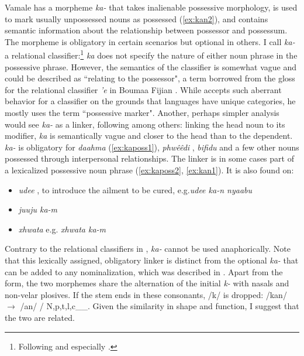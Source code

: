  Vamale has a morpheme \textit{ka-} that takes inalienable possessive morphology, is used to mark usually unpossessed nouns as possessed (\ref{ex:kan2}), and contains semantic information about the relationship between possessor and possessum. The morpheme is obligatory in certain scenarios but optional in others. I call \textit{ka-} a relational classifier:\footnote{Following \textcite[136]{aikhenvald_classifiers_2000} and especially \textcite[399]{lichtenberk_oceanic_2009}.} \textit{ka} does not specify the nature of either noun phrase in the possessive phrase.  However, the semantics of the classifier is somewhat vague and could be described as ``relating to the possessor", a term borrowed from the gloss for the relational classifier \textit{'e} in Boumaa Fijian \parencite[135]{dixon_grammar_1988}. While \textcite{lichtenberk_oceanic_2009} accepts such aberrant behavior for a classifier on the grounds that languages have unique categories, he mostly uses the term ``possessive marker". 
 Another, perhaps simpler analysis would see \textit{ka-} as a linker, following \textcite{bril_ownership_2012} among others: linking the head noun to its modifier, \textit{ka} is semantically vague and closer to the head than to the dependent.
 \textit{ka-} is obligatory for \textit{daahma}  (\ref{ex:kaposs1}), \textit{phwêêdi} , \textit{bifidu}  and a few other nouns possessed through interpersonal relationships. The linker is in some cases part of a lexicalized possessive noun phrase (\ref{ex:kaposs2}, \ref{ex:kan1}). It is also found on: 
 
 \begin{itemize}
 \sloppy
 \item \textit{udee} , to introduce the ailment to be cured, e.g.\textit{udee ka-n nyaabu} 
 \item \textit{juuju ka-m} 
 \item \textit{xhwata}  e.g. \textit{xhwata ka-m} 
 \end{itemize}
 
 Contrary to the relational classifiers in , \textit{ka-} cannot be used anaphorically. %
 Note that this lexically assigned, obligatory linker is distinct from the optional \textit{ka-} that can be added to any nominalization, which was described in . Apart from the form, the two morphemes share the alternation of the initial \textit{k-} with nasals and non-velar plosives. If the stem ends in these consonants, /k/ is dropped: /kan/ $\rightarrow$  /an/ / N,p,t,l,c\_\_. Given the similarity in shape and function, I suggest that the two are related.%
  

